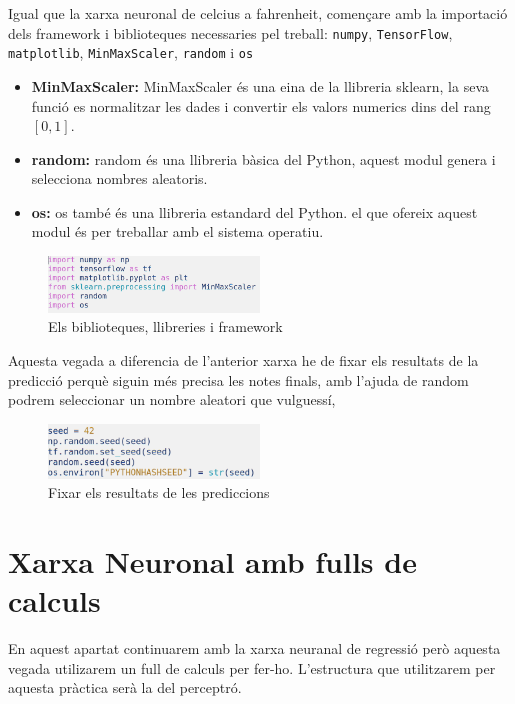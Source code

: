 Igual que la xarxa neuronal de celcius a fahrenheit, començare amb la importació dels framework i biblioteques necessaries pel treball: \texttt{numpy}, \texttt{TensorFlow}, \texttt{matplotlib}, \texttt{MinMaxScaler}, \texttt{random} i \texttt{os}

\begin{itemize}
 \item \textbf{MinMaxScaler: } MinMaxScaler és una eina de la llibreria sklearn, la seva funció es normalitzar les dades i convertir els valors numerics dins del rang $[0,1]$.
 \item \textbf{random: } random és una llibreria bàsica del Python, aquest modul genera i selecciona nombres aleatoris.
 \item \textbf{os: } os també és una llibreria estandard del Python. el que ofereix aquest modul és per treballar amb el sistema operatiu.
\end{itemize}

\begin{figure}[H]
    \centering
    \includegraphics[width=0.5\textwidth]{./figures/21.png}
    \caption{Els biblioteques, llibreries i framework}
\end{figure}

Aquesta vegada a diferencia de l'anterior xarxa he de fixar els resultats de la predicció perquè siguin més precisa les notes finals, amb l'ajuda de random podrem seleccionar un nombre aleatori que vulguessí,


\begin{figure}[H]
    \centering
    \includegraphics[width=0.5\textwidth]{./figures/22.png}
    \caption{Fixar els resultats de les prediccions}
\end{figure}

\section{Xarxa Neuronal amb fulls de calculs}\label{sec:11}
En aquest apartat continuarem amb la xarxa neuranal de regressió però aquesta vegada utilizarem un full de calculs per fer-ho.
L'estructura que utilitzarem per aquesta pràctica serà la del perceptró.

